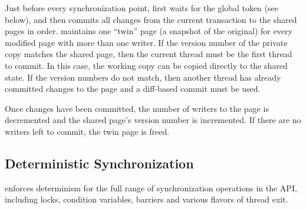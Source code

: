 
Just before every synchronization point, \dthreads{} first waits for
the global token (see below), and then commits all changes from the
current transaction to the shared pages in order. \dthreads{} maintains one
``twin'' page (a snapshot of the original) for every modified page
with more than one writer. If the version number of the private copy
matches the shared page, then the current thread must be the first
thread to commit.  In this case, the working copy can be copied directly
to the shared state.  If the version numbers do not match, then
another thread has already committed changes to the page and a
diff-based commit must be used.

Once changes have been committed, the number of writers to the
page is decremented and the shared page's version number is incremented.
If there are no writers left to commit, the twin page is freed.

\subsection{Deterministic Synchronization}
\label{sec:synchronization}

%
\dthreads{} enforces determinism for the full range of synchronization operations in the
\pthreads{} API, including locks, condition variables, barriers and
various flavors of thread exit.

